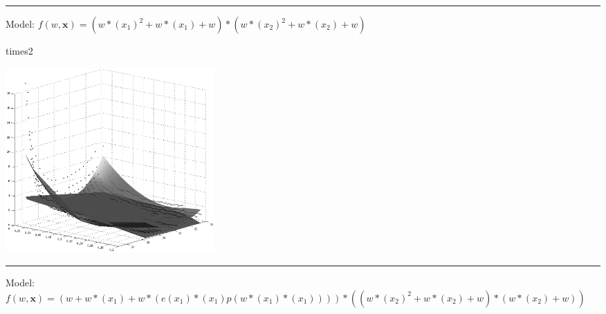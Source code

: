 \documentclass[12pt]{article}
\begin{document}
\hrule
\vspace{1cm}
Model: $f(w,\mathbf{x})=(w*(x_1)^2+w*(x_1)+w)*(w*(x_2)^2+w*(x_2)+w)$

\begin{multicols}{2}
\begin{bundle}{times2}\end{bundle}

\columnbreak
\includegraphics[width=8cm]{2.eps}
\end{multicols}

\hrule
\vspace{1cm}
Model: $f(w,\mathbf{x})=(w+w*(x_1)+w*(e(x_1)*(x_1)p(w*(x_1)*(x_1))))*((w*(x_2)^2+w*(x_2)+w)*(w*(x_2)+w))$
\end{document}
